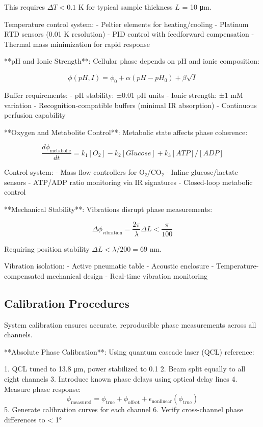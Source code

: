 \documentclass[12pt,a4paper]{report}
\begin{document}
This requires $\Delta T < 0.1$ K for typical sample thickness $L$ = 10 μm.

Temperature control system:
- Peltier elements for heating/cooling
- Platinum RTD sensors (0.01 K resolution)
- PID control with feedforward compensation
- Thermal mass minimization for rapid response

**pH and Ionic Strength**: Cellular phase depends on pH and ionic composition:

\begin{equation}
\phi(pH, I) = \phi_0 + \alpha(pH - pH_0) + \beta\sqrt{I}
\end{equation}

Buffer requirements:
- pH stability: ±0.01 pH units
- Ionic strength: ±1 mM variation
- Recognition-compatible buffers (minimal IR absorption)
- Continuous perfusion capability

**Oxygen and Metabolite Control**: Metabolic state affects phase coherence:

\begin{equation}
\frac{d\phi_{\text{metabolic}}}{dt} = k_1[O_2] - k_2[Glucose] + k_3[ATP]/[ADP]
\end{equation}

Control system:
- Mass flow controllers for O₂/CO₂
- Inline glucose/lactate sensors
- ATP/ADP ratio monitoring via IR signatures
- Closed-loop metabolic control

**Mechanical Stability**: Vibrations disrupt phase measurements:

\begin{equation}
\Delta\phi_{\text{vibration}} = \frac{2\pi}{\lambda} \Delta L < \frac{\pi}{100}
\end{equation}

Requiring position stability $\Delta L < \lambda/200 = 69$ nm.

Vibration isolation:
- Active pneumatic table
- Acoustic enclosure
- Temperature-compensated mechanical design
- Real-time vibration monitoring

\subsection{Calibration Procedures}

System calibration ensures accurate, reproducible phase measurements across all channels.

**Absolute Phase Calibration**: Using quantum cascade laser (QCL) reference:

1. QCL tuned to 13.8 μm, power stabilized to 0.1%
2. Beam split equally to all eight channels
3. Introduce known phase delays using optical delay lines
4. Measure phase response:
   \begin{equation}
   \phi_{\text{measured}} = \phi_{\text{true}} + \phi_{\text{offset}} + \epsilon_{\text{nonlinear}}(\phi_{\text{true}})
   \end{equation}
5. Generate calibration curves for each channel
6. Verify cross-channel phase differences to < 1°
\end{document}
